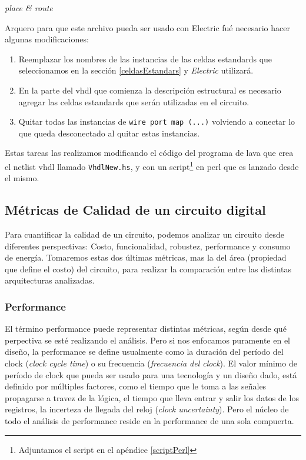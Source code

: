 \emph{place \& route}



Arquero para que este archivo pueda ser usado con Electric fué necesario hacer algunas modificaciones:
\begin{enumerate}
\item Reemplazar los nombres de las instancias de las celdas estandards que  seleccionamos en la sección \ref{celdasEstandars} y \emph{Electric} utilizará.
\item En la parte del vhdl que comienza la descripción estructural es necesario agregar las celdas estandards que serán utilizadas en el circuito.
\item Quitar todas las instancias de \verb|wire port map (...)| volviendo a conectar lo que queda desconectado al quitar estas instancias.
\end{enumerate}  
Estas tareas las realizamos modificando el código del programa de lava que crea el netlist vhdl llamado \verb|VhdlNew.hs|, y con un script\footnote{Adjuntamos el script en el apéndice \ref{scriptPerl}} en perl que es lanzado desde el mismo.
\subsection{Métricas de Calidad de un circuito digital}

Para cuantificar la calidad de un circuito, podemos analizar un circuito desde diferentes perspectivas: Costo, funcionalidad, robustez, performance y consumo de energía. Tomaremos estas dos últimas métricas, mas la del área (propiedad que define el costo) del circuito, para realizar la comparación entre las distintas arquitecturas analizadas.

\subsubsection{Performance}
El término performance puede representar distintas métricas, según desde qué perpectiva se esté realizando el análisis. Pero si nos enfocamos puramente en el diseño, la performance se define usualmente\cite{rabaey2003} como la duración del período del clock (\emph{clock cycle time}) o su frecuencia (\emph{frecuencia del clock}). El valor mínimo de período de clock que pueda ser usado para una tecnología y un diseño dado, está definido por múltiples factores, como el tiempo que le toma a las señales propagarse a travez de la lógica, el tiempo que lleva entrar y salir los datos de los registros, la incerteza de llegada del reloj (\emph{clock uncertainty}). Pero el núcleo de todo el análisis de performance reside en la performance de una sola compuerta.

